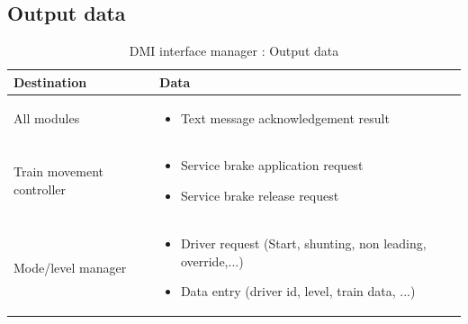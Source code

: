 \documentclass[nocc]{template/openetcs_report}
\begin{document}
\subsection{Output data}
			\begin{longtable}{|l|l|}
				\caption{DMI interface manager : Output data}\\ 
				\hline
				
					\begin{minipage}[t]{0.35\linewidth} \textbf{Destination}	\end{minipage} 
				&	\begin{minipage}[t]{0.65\linewidth} \textbf{Data} \end{minipage} \\
				
				\hline
																																									
					\begin{minipage}[t]{0.35\linewidth} All modules	\end{minipage} 
				&	\begin{minipage}[t]{0.65\linewidth}
						\begin{itemize}
							\item Text message acknowledgement result
						\end{itemize}
					\end{minipage} \\
				
				\hline
				
					\begin{minipage}[t]{0.35\linewidth} Train movement controller	\end{minipage} 
				&	\begin{minipage}[t]{0.65\linewidth}
						\begin{itemize}
							\item Service brake application request
							\item Service brake release request
						\end{itemize}			
					\end{minipage} \\
				
				\hline

					\begin{minipage}[t]{0.35\linewidth} Mode/level manager	\end{minipage} 
				&	\begin{minipage}[t]{0.65\linewidth}
						\begin{itemize}
							\item Driver request (Start, shunting, non leading, override,...)
							\item Data entry (driver id, level, train data, ...)
						\end{itemize}			
					\end{minipage} \\
				

\end{longtable}
\end{document}
